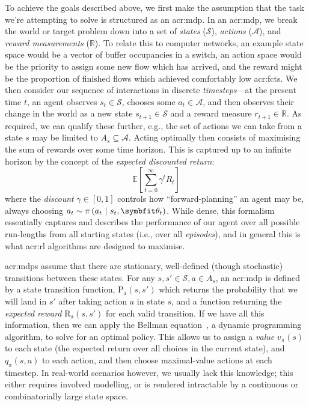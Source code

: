 To achieve the goals described above, we first make the assumption that the task we're attempting to solve is structured as an \gls{acr:mdp}.
In an \gls{acr:mdp}, we break the world or target problem down into a set of \emph{states} ($\mathcal{S}$), \emph{actions} ($\mathcal{A}$), and \emph{reward measurements} ($\mathbb{R}$).
To relate this to computer networks, an example state space would be a vector of buffer occupancies in a switch, an action space would be the priority to assign some new flow which has arrived, and the reward might be the proportion of finished flows which achieved comfortably low \glspl{acr:fct}.
We then consider our sequence of interactions in discrete \emph{timesteps}---at the present time $t$, an agent observes $s_t \in \mathcal{S}$, chooses some $a_t \in \mathcal{A}$, and then observes their change in the world as a new state $s_{t+1} \in \mathcal{S}$ and a reward measure $r_{t+1} \in \mathbb{R}$.
As required, we can qualify these further, e.g., the set of actions we can take from a state $s$ may be limited to $A_s \subseteq \mathcal{A}$.
Acting optimally then consists of maximising the sum of rewards over some time horizon.
This is captured up to an infinite horizon by the concept of the \emph{expected discounted return}:
\begin{equation}
	\mathbb{E}\left[\sum_{t=0}^{\infty}\gamma^{t}R_t\right]
\end{equation}
where the \emph{discount} $\gamma \in \left[0,1\right]$ controls how ``forward-planning'' an agent may be, always choosing $a_t \sim \pi\left(a_t~|~s_t,\wvec{t}\right)$.
While dense, this formalism essentially captures and describes the performance of our agent over all possible run-lengths from all starting states (i.e., over all \emph{episodes}), and in general this is what \gls{acr:rl} algorithms are designed to maximise.

\glspl{acr:mdp} assume that there are stationary, well-defined (though stochastic) transitions between these states.
For any $s, s' \in \mathcal{S}, a \in A_s$, an \gls{acr:mdp} is defined by a state transition function, $\operatorname{P_a}\left(s,s'\right)$ which returns the probability that we will land in $s'$ after taking action $a$ in state $s$, and a function returning the \emph{expected reward} $\operatorname{R_a}\left(s,s'\right)$ for each valid transition.
If we have all this information, then we can apply the Bellman equation~\parencite{10.2307/24900506}, a dynamic programming algorithm, to solve for an optimal policy.
This allows us to assign a \emph{value} $v_\pi{\left(s\right)}$ to each state (the expected return over all choices in the current state), and $q_\pi{\left(s,a\right)}$ to each action, and then choose maximal-value actions at each timestep.
In real-world scenarios however, we usually lack this knowledge; this either requires involved modelling, or is rendered intractable by a continuous or combinatorially large state space.

